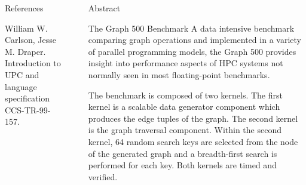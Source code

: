\documentclass[final]{beamer}
\newlength{\sepwid}
\newlength{\onecolwid}
\newlength{\twocolwid}
\begin{document}
\begin{frame}[t]
\begin{columns}[t]
\begin{column}{\onecolwid}
\begin{block}{References}
{{\begin{thebibliography}{99}
					  William W. Carlson, Jesse M. Draper. Introduction to UPC and language specification CCS-TR-99-157.
					 \end{thebibliography}}}
				\end{block}
			\end{column}
			\begin{column}{\sepwid}\end{column}			%
			\begin{column}{\twocolwid}
				\begin{alertblock}{Abstract}
				\end{alertblock}
				\begin{block}{The Graph 500 Benchmark}
					A data intensive benchmark comparing graph operations and implemented in a variety of parallel programming models, the Graph 500 provides insight into performance aspects of HPC systems not normally seen in most floating-point benchmarks. 
					
					The benchmark is composed of two kernels. The first kernel is a scalable data generator component which produces the edge tuples of the graph.  The second kernel is the graph traversal component.  Within the second kernel, 64 random search keys are selected from the node of the generated  graph and a breadth-first search is performed for each key. Both kernels are timed and verified.
					

\end{block}
\end{column}
\end{columns}
\end{frame}
\end{document}
